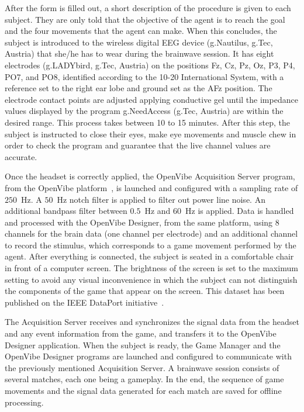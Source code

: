 \documentclass[journal]{IEEEtran}
\begin{document}
After the form is filled out, a short description of the procedure is given to each subject. They are only told that the objective of the agent is to reach the goal and the four movements that the agent can make. When this concludes, the subject is introduced to the wireless digital EEG device (g.Nautilus, g.Tec, Austria) that she/he has to wear during the brainwave session. It has eight electrodes (g.LADYbird, g.Tec, Austria) on the positions Fz, Cz, Pz, Oz, P3, P4, PO7, and PO8, identified according to the 10-20 International System, with a reference set to the right ear lobe and ground set as the AFz position. The electrode contact points are adjusted applying conductive gel until the impedance values displayed by the program g.NeedAccess (g.Tec, Austria) are within the desired range. This process takes between 10 to 15 minutes. After this step, the subject is instructed to close their eyes, make eye movements and muscle chew in order to check the program and guarantee that the live channel values are accurate.

Once the headset is correctly applied, the OpenVibe Acquisition Server program, from the OpenVibe platform~\cite{OPEN-VIBE-PAPER}, is launched and configured with a sampling rate of $250$~Hz. A $50$~Hz notch filter is applied to filter out power line noise. An additional bandpass filter between $0.5$~Hz and $60$~Hz is applied. Data is handled and processed with the OpenVibe Designer, from the same platform, using 8 channels for the brain data (one channel per electrode) and an additional channel to record the stimulus, which corresponds to a game movement performed by the agent.  After everything is connected, the subject is seated in a comfortable chair in front of a computer screen. The brightness of the screen is set to the maximum setting to avoid any visual inconvenience in which the subject can not distinguish the components of the game that appear on the screen.  This dataset has been published on the IEEE DataPort initiative~\cite{6emh-wb46-19}.

The Acquisition Server receives and synchronizes the signal data from the headset and any event information from the game, and transfers it to the OpenVibe Designer application. When the subject is ready, the Game Manager and the OpenVibe Designer programs are launched and configured to communicate with the previously mentioned Acquisition Server. A brainwave session consists of several matches, each one being a gameplay.  In the end, the sequence of game movements and the signal data generated for each match are saved for offline processing.
\end{document}
